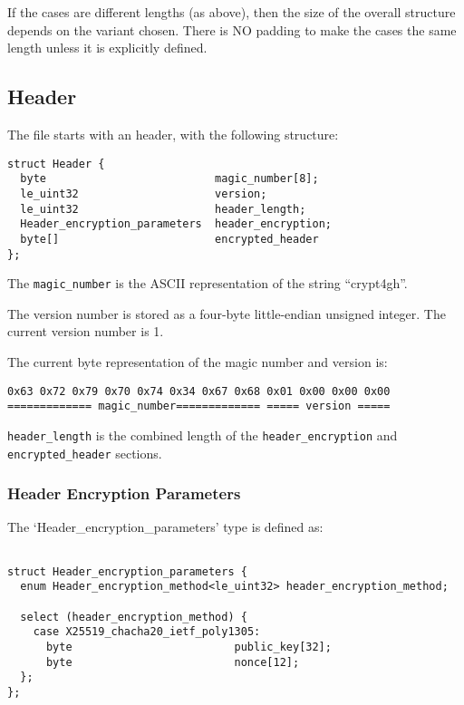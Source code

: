 \documentclass[10pt]{article}
\newcommand{\kw}[1]{\texttt{#1}}
\begin{document}
If the cases are different lengths (as above), then the size of the overall structure depends on the variant chosen.
There is NO padding to make the cases the same length unless it is explicitly defined.

\subsection{Header}

The file starts with an header, with the following structure:

\begin{verbatim}
struct Header {
  byte                          magic_number[8];
  le_uint32                     version;
  le_uint32                     header_length;
  Header_encryption_parameters  header_encryption;
  byte[]                        encrypted_header
};
\end{verbatim}

The \kw{magic\_number} is the ASCII representation of the string ``crypt4gh''.

The version number is stored as a four-byte little-endian unsigned integer.
The current version number is 1.

The current byte representation of the magic number and version is:
\begin{verbatim}
0x63 0x72 0x79 0x70 0x74 0x34 0x67 0x68 0x01 0x00 0x00 0x00
============= magic_number============= ===== version =====
\end{verbatim}

\kw{header\_length} is the combined length of the \kw{header\_encryption} and \kw{encrypted\_header} sections.

\subsubsection{Header Encryption Parameters}\label{header:encryption}


The `Header\_encryption\_parameters' type is defined as:

\begin{verbatim}

struct Header_encryption_parameters {
  enum Header_encryption_method<le_uint32> header_encryption_method;

  select (header_encryption_method) {
    case X25519_chacha20_ietf_poly1305:
      byte                         public_key[32];
      byte                         nonce[12];
  };
};
\end{verbatim}
\end{document}
